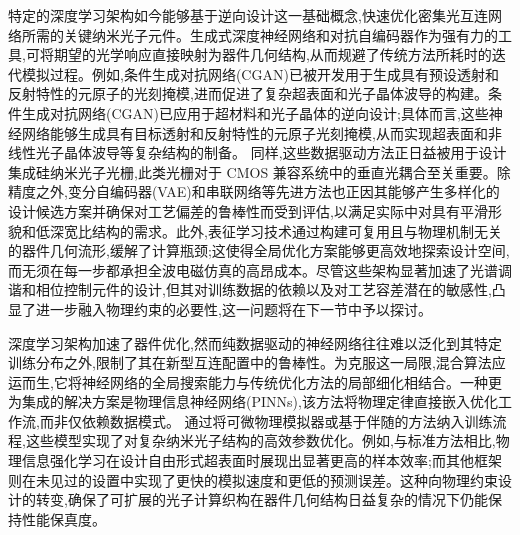 \documentclass[11pt]{article}
\begin{document}
特定的深度学习架构如今能够基于逆向设计这一基础概念,快速优化密集光互连网络所需的关键纳米光子元件。生成式深度神经网络和对抗自编码器作为强有力的工具,可将期望的光学响应直接映射为器件几何结构,从而规避了传统方法所耗时的迭代模拟过程。例如,条件生成对抗网络(CGAN)已被开发用于生成具有预设透射和反射特性的元原子的光刻掩模,进而促进了复杂超表面和光子晶体波导的构建。条件生成对抗网络(CGAN)已应用于超材料和光子晶体的逆向设计;具体而言,这些神经网络能够生成具有目标透射和反射特性的元原子光刻掩模,从而实现超表面和非线性光子晶体波导等复杂结构的制备。\citep{doi_10_1109_metamaterials62190_2024_10703328_b89eaef7} 同样,这些数据驱动方法正日益被用于设计集成硅纳米光子光栅,此类光栅对于 CMOS 兼容系统中的垂直光耦合至关重要。除精度之外,变分自编码器(VAE)和串联网络等先进方法也正因其能够产生多样化的设计候选方案并确保对工艺偏差的鲁棒性而受到评估,以满足实际中对具有平滑形貌和低深宽比结构的需求。此外,表征学习技术通过构建可复用且与物理机制无关的器件几何流形,缓解了计算瓶颈;这使得全局优化方案能够更高效地探索设计空间,而无须在每一步都承担全波电磁仿真的高昂成本。尽管这些架构显著加速了光谱调谐和相位控制元件的设计,但其对训练数据的依赖以及对工艺容差潜在的敏感性,凸显了进一步融入物理约束的必要性,这一问题将在下一节中予以探讨。\citep{doi_10_1109_metamaterials62190_2024_10703328_b89eaef7} \citep{doi_10_1109_cleo_europe_eqec52157_2021_9542763_c5b6331c} \citep{doi_10_29026_oes_2022_210012_27973a69} \citep{doi_10_1002_adom_202502062_d73a85e1}

深度学习架构加速了器件优化,然而纯数据驱动的神经网络往往难以泛化到其特定训练分布之外,限制了其在新型互连配置中的鲁棒性。为克服这一局限,混合算法应运而生,它将神经网络的全局搜索能力与传统优化方法的局部细化相结合。一种更为集成的解决方案是物理信息神经网络(PINNs),该方法将物理定律直接嵌入优化工作流,而非仅依赖数据模式。\citep{doi_10_1038_s41467_025_64624_3_42144da5} \citep{doi_10_3390_s25196242_b7203a7f} 通过将可微物理模拟器或基于伴随的方法纳入训练流程,这些模型实现了对复杂纳米光子结构的高效参数优化。例如,与标准方法相比,物理信息强化学习在设计自由形式超表面时展现出显著更高的样本效率;而其他框架则在未见过的设置中实现了更快的模拟速度和更低的预测误差。这种向物理约束设计的转变,确保了可扩展的光子计算织构在器件几何结构日益复杂的情况下仍能保持性能保真度。\citep{doi_10_1021_acsphotonics_2c00968_06a2e96b} \citep{s2_037e66f37189104d61c0d000de0cee202b7eec9e_d15b8018} \citep{doi_10_1515_nanoph_2023_0852_cb27a26f} \citep{doi_10_48550_arxiv_2209_10098_b3bedb78}
\end{document}
